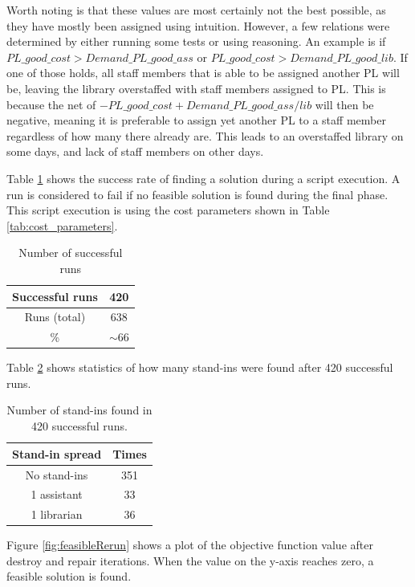 Worth noting is that these values are most certainly not the best possible, as they have mostly been assigned using intuition. However, a few relations were determined by either running some tests or using reasoning. An example is if $PL\_good\_cost > Demand\_PL\_good\_ass$ or $PL\_good\_cost > Demand\_PL\_good\_lib$. If one of those holds, all staff members that is able to be assigned another PL will be, leaving the library overstaffed with staff members assigned to PL. This is because the net of $-PL\_good\_cost + Demand\_PL\_good\_ass/lib$ will then be negative, meaning it is preferable to assign yet another PL to a staff member regardless of how many there already are. This leads to an overstaffed library on some days, and lack of staff members on other days.

Table \ref{successful_iter} shows the success rate of finding a solution during a script execution. A run is considered to fail if no feasible solution is found during the final phase. This script execution is using the cost parameters shown in Table \ref{tab:cost_parameters}. 
\begin{table}[!h]
\centering
\caption{Number of successful runs}
\label{successful_iter}
\begin{tabular}{|c|c|}
\hline
Successful runs         & 420      \\ \hline
Runs (total) & 638      \\ \hline
\%                 & $\sim$66 \\ \hline
\end{tabular}
\end{table}

Table \ref{tab:stand_in_spread} shows statistics of how many stand-ins were found after 420 successful runs. 
\begin{table}[!h]
\centering
\caption{Number of stand-ins found in 420 successful runs.}
\label{tab:stand_in_spread}
\begin{tabular}{|c|c|}
\hline
\rowcolor[HTML]{D2D2D2} 
Stand-in spread & Times \\ \hline
No stand-ins    & 351                      \\ \hline
1 assistant     & 33                      \\ \hline
1 librarian 	& 36 \\ \hline
\end{tabular}
\end{table}

Figure \ref{fig:feasibleRerun} shows a plot of the objective function value after destroy and repair iterations. When the value on the y-axis reaches zero, a feasible solution is found.

